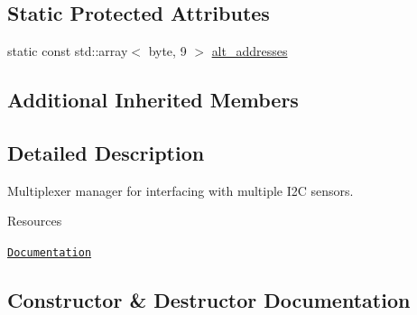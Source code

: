 \subsection*{Static Protected Attributes}
\begin{DoxyCompactItemize}
\item 
static const std\+::array$<$ byte, 9 $>$ \hyperlink{class_loom___multiplexer_aa7bed0505f58c0c7ef22fe9c8844d807}{alt\+\_\+addresses}
\end{DoxyCompactItemize}
\subsection*{Additional Inherited Members}


\subsection{Detailed Description}
Multiplexer manager for interfacing with multiple I2C sensors. 

\begin{DoxyParagraph}{Resources}

\begin{DoxyItemize}
\item \href{https://openslab-osu.github.io/Loom/html/class_loom___multiplexer.html}{\tt Documentation} 
\end{DoxyItemize}
\end{DoxyParagraph}


\subsection{Constructor \& Destructor Documentation}
